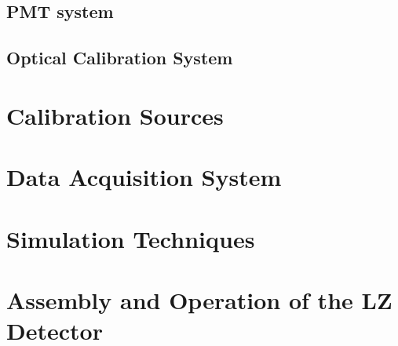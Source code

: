 \subsection{PMT system}
\subsection{Optical Calibration System}

\section{Calibration Sources}

\section{Data Acquisition System}

\section{Simulation Techniques}

\section{Assembly and Operation of the LZ Detector}